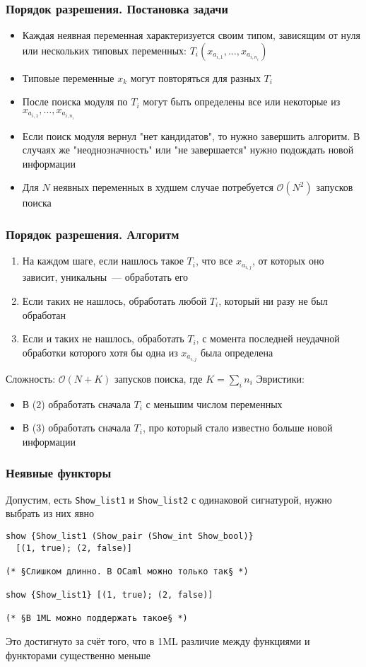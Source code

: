 \documentclass{beamer}
\begin{document}
\begin{frame}\frametitle{Порядок разрешения. Постановка задачи}
\begin{itemize}
  \item Каждая неявная переменная характеризуется своим типом, зависящим от нуля или нескольких типовых переменных: $T_i(x_{a_{i,1}}, \dots, x_{a_{i,n_i}})$
  \item Типовые переменные $x_k$ могут повторяться для разных $T_i$
  \item После поиска модуля по $T_i$ могут быть определены все или некоторые из $x_{a_{i,1}}, \dots, x_{a_{i,n_i}}$
  \item Если поиск модуля вернул "нет кандидатов", то нужно завершить алгоритм. В случаях же "неоднозначность" или "не завершается" нужно подождать новой информации
  \item Для $N$ неявных переменных в худшем случае потребуется $\mathcal{O}(N^2)$ запусков поиска 
\end{itemize}
\end{frame}

\begin{frame}\frametitle{Порядок разрешения. Алгоритм}
\begin{enumerate}
  \item На каждом шаге, если нашлось такое $T_i$, что все $x_{a_{i,j}}$, от которых оно зависит, уникальны~--- обработать его
  \item Если таких не нашлось, обработать любой $T_i$, который ни разу не был обработан
  \item Если и таких не нашлось, обработать $T_i$, с момента последней неудачной обработки которого хотя бы одна из $x_{a_{i,j}}$ была определена
\end{enumerate}
Сложность: $\mathcal{O}(N + K)$ запусков поиска, где $K = \sum\limits_i n_i$
Эвристики:
\begin{itemize}
  \item В (2) обработать сначала $T_i$ с меньшим числом переменных
  \item В (3) обработать сначала $T_i$, про который стало известно больше новой информации
\end{itemize}
\end{frame}

\lstset{language=caml}
\begin{frame}[fragile]\frametitle{Неявные функторы}
Допустим, есть \texttt{Show\_list1} и \texttt{Show\_list2} с одинаковой сигнатурой, нужно выбрать из них явно
\begin{lstlisting}
show {Show_list1 (Show_pair (Show_int Show_bool)}
  [(1, true); (2, false)]

(* §Слишком длинно. В OCaml можно только так§ *)

show {Show_list1} [(1, true); (2, false)]

(* §В 1ML можно поддержать такое§ *)
\end{lstlisting}
Это достигнуто за счёт того, что в 1ML различие между функциями и функторами существенно меньше
\end{frame}
\end{document}
